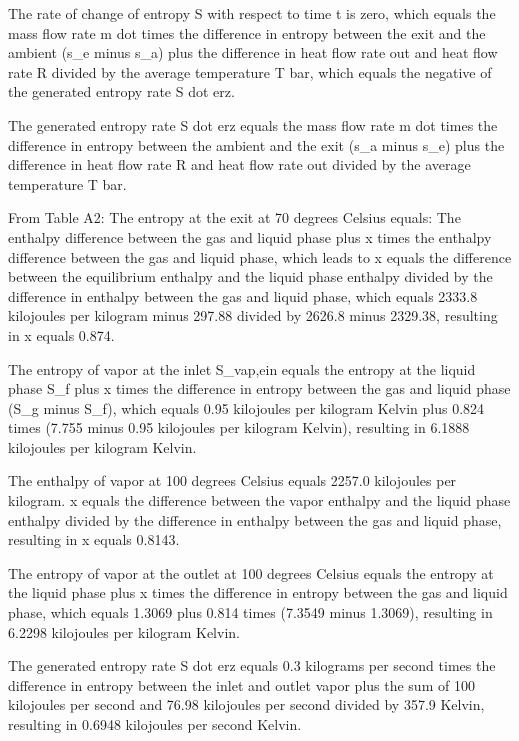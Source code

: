 The rate of change of entropy S with respect to time t is zero, which equals the mass flow rate m dot times the difference in entropy between the exit and the ambient (s_e minus s_a) plus the difference in heat flow rate out and heat flow rate R divided by the average temperature T bar, which equals the negative of the generated entropy rate S dot erz.

The generated entropy rate S dot erz equals the mass flow rate m dot times the difference in entropy between the ambient and the exit (s_a minus s_e) plus the difference in heat flow rate R and heat flow rate out divided by the average temperature T bar.

From Table A2:
The entropy at the exit at 70 degrees Celsius equals:
The enthalpy difference between the gas and liquid phase plus x times the enthalpy difference between the gas and liquid phase, which leads to x equals the difference between the equilibrium enthalpy and the liquid phase enthalpy divided by the difference in enthalpy between the gas and liquid phase, which equals 2333.8 kilojoules per kilogram minus 297.88 divided by 2626.8 minus 2329.38, resulting in x equals 0.874.

The entropy of vapor at the inlet S_vap,ein equals the entropy at the liquid phase S_f plus x times the difference in entropy between the gas and liquid phase (S_g minus S_f), which equals 0.95 kilojoules per kilogram Kelvin plus 0.824 times (7.755 minus 0.95 kilojoules per kilogram Kelvin), resulting in 6.1888 kilojoules per kilogram Kelvin.

The enthalpy of vapor at 100 degrees Celsius equals 2257.0 kilojoules per kilogram.
x equals the difference between the vapor enthalpy and the liquid phase enthalpy divided by the difference in enthalpy between the gas and liquid phase, resulting in x equals 0.8143.

The entropy of vapor at the outlet at 100 degrees Celsius equals the entropy at the liquid phase plus x times the difference in entropy between the gas and liquid phase, which equals 1.3069 plus 0.814 times (7.3549 minus 1.3069), resulting in 6.2298 kilojoules per kilogram Kelvin.

The generated entropy rate S dot erz equals 0.3 kilograms per second times the difference in entropy between the inlet and outlet vapor plus the sum of 100 kilojoules per second and 76.98 kilojoules per second divided by 357.9 Kelvin, resulting in 0.6948 kilojoules per second Kelvin.
